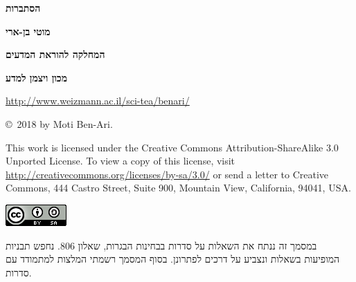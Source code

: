 \documentclass[12pt,a4paper]{article}
\begin{document}
\thispagestyle{empty}


\begin{center}
\textbf{\Huge הסתברות}

\bigskip
\bigskip

\textbf{\Large מוטי בן-ארי}

\bigskip

\textbf{\Large המחלקה להוראת המדעים}

\bigskip

\textbf{\Large מכון ויצמן למדע}

\bigskip

\url{http://www.weizmann.ac.il/sci-tea/benari/}

\bigskip

\end{center}


\begin{center}
\sffamily\copyright{}\  2018 by Moti Ben-Ari.
\end{center}

\begin{footnotesize}
\sffamily
This work is licensed under the Creative Commons Attribution-ShareAlike 3.0 Unported License. To view a copy of this license, visit \url{http://creativecommons.org/licenses/by-sa/3.0/} or send a letter to Creative Commons, 444 Castro Street, Suite 900, Mountain View, California, 94041, USA.
\end{footnotesize}

\bigskip

\begin{center}
\includegraphics[width=.2\textwidth]{../by-sa.png}
\end{center}

\bigskip
\bigskip
\bigskip

%
\newpage


במסמך זה ננתח את השאלות על סדרות בבחינות הבגרות, שאלון
$806$.
נחפש תבניות המופיעות בשאלות ונצביע על דרכים לפתרונן. בסוף המסמך רשמתי המלצות למתמודד עם סדרות.




\end{document}
